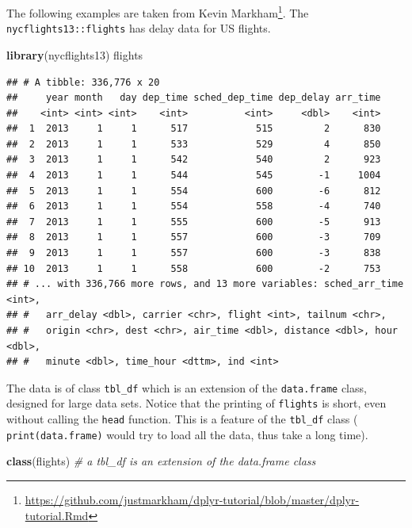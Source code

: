 \documentclass[]{book}
\newenvironment{Shaded}{\begin{snugshade}}{\end{snugshade}}
\newcommand{\CommentTok}[1]{\textcolor[rgb]{0.56,0.35,0.01}{\textit{#1}}}
\newcommand{\KeywordTok}[1]{\textcolor[rgb]{0.13,0.29,0.53}{\textbf{#1}}}
\newcommand{\NormalTok}[1]{#1}
\renewcommand{\href}[2]{#2\footnote{\url{#1}}}
\theoremstyle{definition}
\theoremstyle{definition}
\theoremstyle{definition}
\theoremstyle{remark}
\begin{document}
The following examples are taken from \href{https://github.com/justmarkham/dplyr-tutorial/blob/master/dplyr-tutorial.Rmd}{Kevin Markham}.
The \texttt{nycflights13::flights} has delay data for US flights.

\begin{Shaded}
\begin{Highlighting}[]
\KeywordTok{library}\NormalTok{(nycflights13)}
\NormalTok{flights}
\end{Highlighting}
\end{Shaded}

\begin{verbatim}
## # A tibble: 336,776 x 20
##     year month   day dep_time sched_dep_time dep_delay arr_time
##    <int> <int> <int>    <int>          <int>     <dbl>    <int>
##  1  2013     1     1      517            515         2      830
##  2  2013     1     1      533            529         4      850
##  3  2013     1     1      542            540         2      923
##  4  2013     1     1      544            545        -1     1004
##  5  2013     1     1      554            600        -6      812
##  6  2013     1     1      554            558        -4      740
##  7  2013     1     1      555            600        -5      913
##  8  2013     1     1      557            600        -3      709
##  9  2013     1     1      557            600        -3      838
## 10  2013     1     1      558            600        -2      753
## # ... with 336,766 more rows, and 13 more variables: sched_arr_time <int>,
## #   arr_delay <dbl>, carrier <chr>, flight <int>, tailnum <chr>,
## #   origin <chr>, dest <chr>, air_time <dbl>, distance <dbl>, hour <dbl>,
## #   minute <dbl>, time_hour <dttm>, ind <int>
\end{verbatim}

The data is of class \texttt{tbl\_df} which is an extension of the \texttt{data.frame} class, designed for large data sets.
Notice that the printing of \texttt{flights} is short, even without calling the \texttt{head} function. This is a feature of the \texttt{tbl\_df} class ( \texttt{print(data.frame)} would try to load all the data, thus take a long time).

\begin{Shaded}
\begin{Highlighting}[]
\KeywordTok{class}\NormalTok{(flights) }\CommentTok{# a tbl_df is an extension of the data.frame class}
\end{Highlighting}
\end{Shaded}
\end{document}
